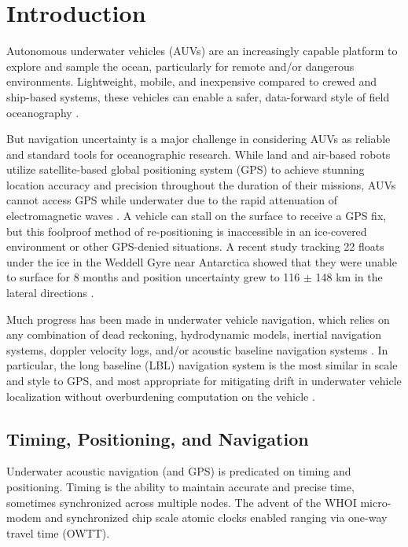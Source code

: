 \section{\label{sec:1} Introduction} 

Autonomous underwater vehicles (AUVs) are an increasingly capable platform to explore and sample the ocean, particularly for remote and/or dangerous environments.
Lightweight, mobile, and inexpensive compared to crewed and ship-based systems, these vehicles can enable a safer, data-forward style of field oceanography \citep{bellingham_robotics_2007,petillot_underwater_2019}.

But navigation uncertainty is a major challenge in considering AUVs as reliable and standard tools for oceanographic research.
While land and air-based robots utilize satellite-based global positioning system (GPS) to achieve stunning location accuracy and precision throughout the duration of their missions, AUVs cannot access GPS while underwater due to the rapid attenuation of electromagnetic waves \citep{preisig_acoustic_2007}.
A vehicle can stall on the surface to receive a GPS fix, but this foolproof method of re-positioning is inaccessible in an ice-covered environment or other GPS-denied situations.
A recent study tracking 22 floats under the ice in the Weddell Gyre near Antarctica showed that they were unable to surface for 8 months and position uncertainty grew to 116 $\pm$ 148 km in the lateral directions \citep{chamberlain_observing_2018}.

Much progress has been made in underwater vehicle navigation, which relies on any combination of dead reckoning, hydrodynamic models, inertial navigation systems, doppler velocity logs, and/or acoustic baseline navigation systems \citep{paull_auv_2014}.
In particular, the long baseline (LBL) navigation system is the most similar in scale and style to GPS, and most appropriate for mitigating drift in underwater vehicle localization without overburdening computation on the vehicle \citep{van_uffelen_global_2021}.

\subsection{Timing, Positioning, and Navigation}

Underwater acoustic navigation (and GPS) is predicated on timing and positioning.
Timing is the ability to maintain accurate and precise time, sometimes synchronized across multiple nodes.
The advent of the WHOI micro-modem \citep{singh_underwater_2006} and synchronized chip scale atomic clocks \citep{gardner_second_2016} enabled ranging via one-way travel time (OWTT).

